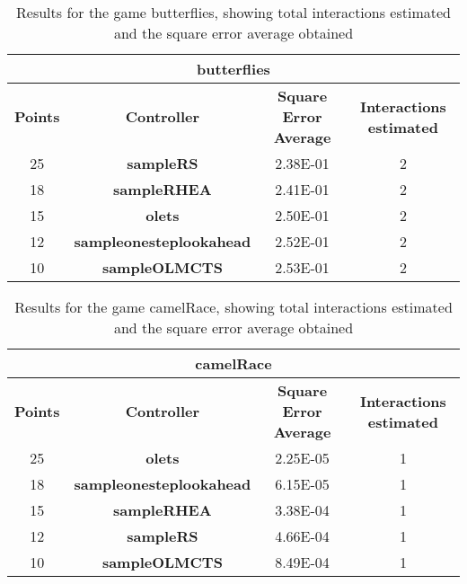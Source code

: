 \begin{table*}[!t]
\begin{center}
\begin{adjustbox}{width=1\textwidth}
\begin{tabular}{|c|c|c|c|}
\hline
\multicolumn{4}{|c|}{\textbf{butterflies}}\\
\hline
\textbf{Points} & \textbf{Controller} & \textbf{Square Error Average} & \textbf{Interactions estimated}\\
\hline
25 & \textbf{sampleRS} & 2.38E-01 & 2
 \\
\hline
18 & \textbf{sampleRHEA} & 2.41E-01 & 2
 \\
\hline
15 & \textbf{olets} & 2.50E-01 & 2
 \\
\hline
12 & \textbf{sampleonesteplookahead} & 2.52E-01 & 2
 \\
\hline
10 & \textbf{sampleOLMCTS} & 2.53E-01 & 2
 \\
\hline
\end{tabular}
\end{adjustbox}
\caption{Results for the game butterflies, showing total interactions estimated and the square error average obtained}
\label{tab:weights}
\end{center}
\end{table*}
\begin{table*}[!t]
\begin{center}
\begin{adjustbox}{width=1\textwidth}
\begin{tabular}{|c|c|c|c|}
\hline
\multicolumn{4}{|c|}{\textbf{camelRace}}\\
\hline
\textbf{Points} & \textbf{Controller} & \textbf{Square Error Average} & \textbf{Interactions estimated}\\
\hline
25 & \textbf{olets} & 2.25E-05 & 1
 \\
\hline
18 & \textbf{sampleonesteplookahead} & 6.15E-05 & 1
 \\
\hline
15 & \textbf{sampleRHEA} & 3.38E-04 & 1
 \\
\hline
12 & \textbf{sampleRS} & 4.66E-04 & 1
 \\
\hline
10 & \textbf{sampleOLMCTS} & 8.49E-04 & 1
 \\
\hline
\end{tabular}
\end{adjustbox}
\caption{Results for the game camelRace, showing total interactions estimated and the square error average obtained}
\label{tab:weights}
\end{center}
\end{table*}
